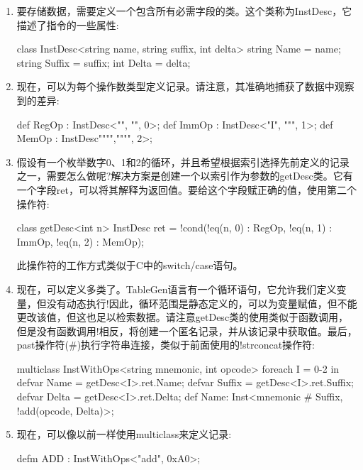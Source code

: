 \begin{enumerate}
\item
要存储数据，需要定义一个包含所有必需字段的类。这个类称为InstDesc，它描述了指令的一些属性:

\begin{shell}
class InstDesc<string name, string suffix, int delta> {
    string Name = name;
    string Suffix = suffix;
    int Delta = delta;
}
\end{shell}

\item
现在，可以为每个操作数类型定义记录。请注意，其准确地捕获了数据中观察到的差异:

\begin{shell}
def RegOp : InstDesc<"", "", 0>;
def ImmOp : InstDesc<"I", """, 1>;
def MemOp : InstDesc"""","""", 2>;
\end{shell}

\item
假设有一个枚举数字0、1和2的循环，并且希望根据索引选择先前定义的记录之一，需要怎么做呢?解决方案是创建一个以索引作为参数的getDesc类。它有一个字段ret，可以将其解释为返回值。要给这个字段赋正确的值，使用第二个操作符:

\begin{shell}
class getDesc<int n> {
    InstDesc ret = !cond(!eq(n, 0) : RegOp,
                         !eq(n, 1) : ImmOp,
                         !eq(n, 2) : MemOp);
}
\end{shell}

此操作符的工作方式类似于C中的switch/case语句。

\item
现在，可以定义多类了。TableGen语言有一个循环语句，它允许我们定义变量，但没有动态执行!因此，循环范围是静态定义的，可以为变量赋值，但不能更改该值，但这也足以检索数据。请注意getDesc类的使用类似于函数调用，但是没有函数调用!相反，将创建一个匿名记录，并从该记录中获取值。最后，past操作符(\#)执行字符串连接，类似于前面使用的!strconcat操作符:

\begin{shell}
multiclass InstWithOps<string mnemonic, int opcode> {
    foreach I = 0-2 in {
        defvar Name = getDesc<I>.ret.Name;
        defvar Suffix = getDesc<I>.ret.Suffix;
        defvar Delta = getDesc<I>.ret.Delta;
        def Name: Inst<mnemonic # Suffix,
                            !add(opcode, Delta)>;
    }
}
\end{shell}

\item
现在，可以像以前一样使用multiclass来定义记录:

\begin{shell}
defm ADD : InstWithOps<"add", 0xA0>;
\end{shell}
\end{enumerate}

